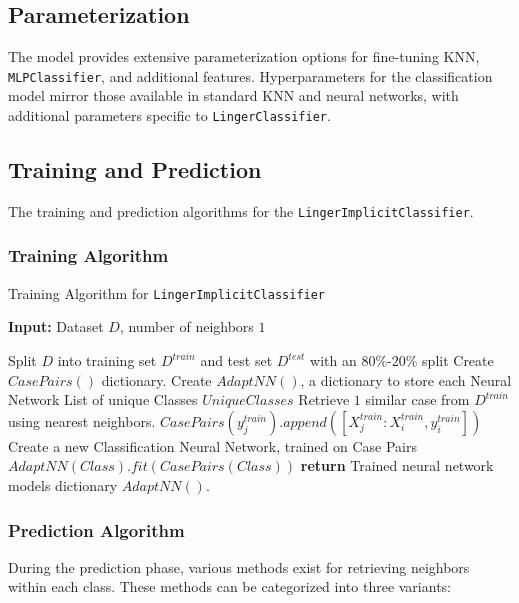 \documentclass[a4paper, 12pt]{report}
\begin{document}
\subsection{Parameterization}
The model provides extensive parameterization options for fine-tuning KNN, \texttt{MLPClassifier}, and additional features. 
Hyperparameters for the classification model mirror those available in standard KNN and neural networks, with additional parameters specific to \texttt{LingerClassifier}.

\subsection{Training and Prediction}
The training and prediction algorithms for the \texttt{LingerImplicitClassifier}.

\subsubsection{Training Algorithm}
\begin{algorithm}[H]
    \caption{Training Algorithm for \texttt{LingerImplicitClassifier}}
    \label{alg:LingerImplicitClassifier_train}

    \textbf{Input:} Dataset $D$, number of neighbors $1$
    \begin{algorithmic}
        \State Split $D$ into training set $D^{train}$ and test set $D^{test}$ with an $80\%$-$20\%$ split
        \State Create $CasePairs()$ dictionary.
        \State Create $AdaptNN()$, a dictionary to store each Neural Network
        \State List of unique Classes $UniqueClasses$
            \State Retrieve $1$ similar case from $D^{train}$ using nearest neighbors.
                \State $CasePairs(y^{train}_j).append([X^{train}_j:X^{train}_i, y^{train}_i])$
            \EndFor
        \EndFor
            \State Create a new Classification Neural Network, trained on Case Pairs
            \State $AdaptNN(Class).fit(CasePairs(Class))$
        \EndFor
        \State \textbf{return} Trained neural network models dictionary $AdaptNN()$.
    \end{algorithmic}
\end{algorithm}

\subsubsection{Prediction Algorithm}
During the prediction phase, various methods exist for retrieving neighbors within each class. These methods can be categorized into three variants:
\end{document}
